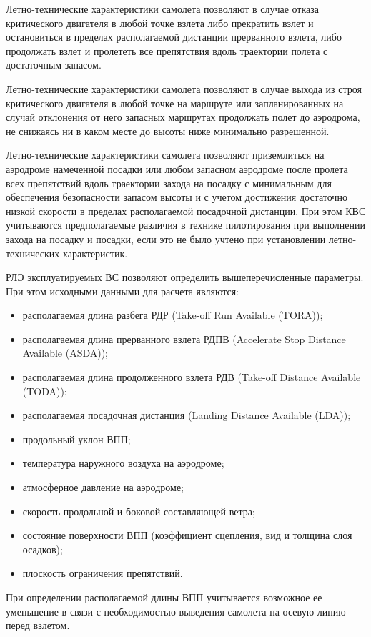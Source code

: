 Летно-технические характеристики самолета позволяют в случае отказа критического двигателя в любой точке взлета либо прекратить взлет и остановиться в пределах располагаемой дистанции прерванного взлета, либо продолжать взлет и пролететь все препятствия вдоль траектории полета с достаточным запасом. 
 
Летно-технические характеристики самолета позволяют в случае выхода из строя критического двигателя в любой точке на маршруте или запланированных на случай отклонения от него запасных маршрутах продолжать полет до аэродрома, не снижаясь ни в каком месте до высоты ниже минимально разрешенной. 

Летно-технические характеристики самолета позволяют приземлиться на аэродроме намеченной посадки или любом запасном аэродроме после пролета всех препятствий вдоль траектории захода на посадку с минимальным для обеспечения безопасности запасом высоты и с учетом достижения достаточно низкой скорости в пределах располагаемой посадочной дистанции. При этом КВС учитываются предполагаемые различия в технике пилотирования при выполнении захода на посадку и посадки, если это не было учтено при установлении летно-технических характеристик.

РЛЭ эксплуатируемых ВС позволяют определить вышеперечисленные параметры. При этом исходными данными для расчета являются:
\begin{itemize} 
    \item располагаемая длина разбега РДР (Take-off Run Available (TORA));
    \item располагаемая длина прерванного взлета РДПВ (Accelerate Stop Distance Available (ASDA));
    \item располагаемая длина продолженного взлета РДВ (Take-off Distance Available (TODA));
    \item располагаемая посадочная дистанция (Landing Distance Available (LDA));
    \item продольный уклон ВПП;
    \item температура наружного воздуха на аэродроме;
    \item атмосферное давление на аэродроме;
    \item скорость продольной и боковой составляющей ветра;
    \item состояние поверхности ВПП (коэффициент сцепления, вид и толщина слоя осадков);
    \item плоскость ограничения препятствий.
\end{itemize}
При определении располагаемой длины ВПП учитывается возможное ее уменьшение в связи с необходимостью выведения самолета на осевую линию перед взлетом.

